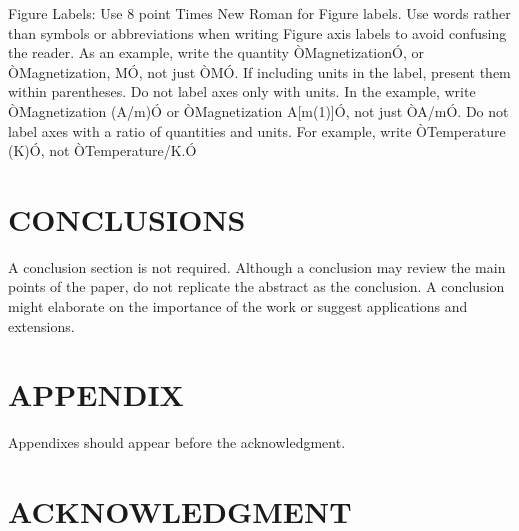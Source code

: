 \documentclass[letterpaper, 10 pt, conference]{ieeeconf}  %
\begin{document}
Figure Labels: Use 8 point Times New Roman for Figure labels. Use words rather than symbols or abbreviations when writing Figure axis labels to avoid confusing the reader. As an example, write the quantity ÒMagnetizationÓ, or ÒMagnetization, MÓ, not just ÒMÓ. If including units in the label, present them within parentheses. Do not label axes only with units. In the example, write ÒMagnetization (A/m)Ó or ÒMagnetization {A[m(1)]}Ó, not just ÒA/mÓ. Do not label axes with a ratio of quantities and units. For example, write ÒTemperature (K)Ó, not ÒTemperature/K.Ó

\section{CONCLUSIONS}

A conclusion section is not required. Although a conclusion may review the main points of the paper, do not replicate the abstract as the conclusion. A conclusion might elaborate on the importance of the work or suggest applications and extensions. 

\addtolength{\textheight}{-12cm}   %







\section*{APPENDIX}

Appendixes should appear before the acknowledgment.

\section*{ACKNOWLEDGMENT}
\end{document}

